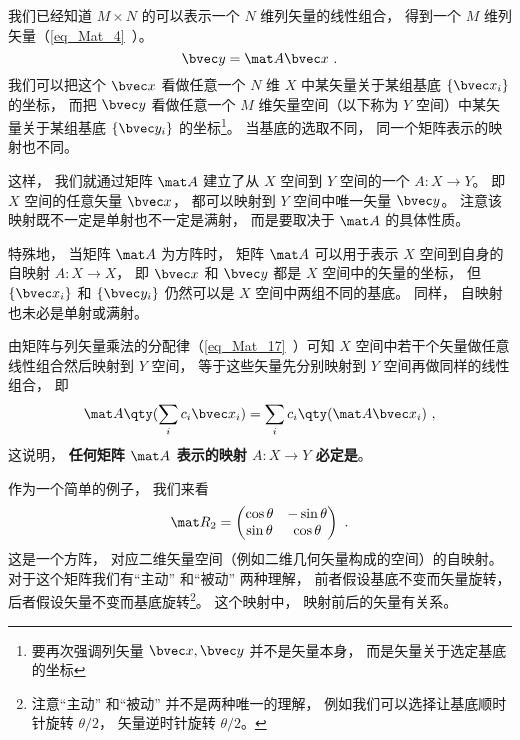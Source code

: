 


我们已经知道 $M\times N$ 的可以表示一个 $N$ 维列矢量的线性组合， 得到一个 $M$ 维列矢量（\autoref{eq_Mat_4}~）。
\begin{equation}\label{eq_MatLS_1}
\bvec y = \mat A \bvec x~.
\end{equation}
我们可以把这个 $\bvec x$ 看做任意一个 $N$ 维 $X$ 中某矢量关于某组基底 $\{\bvec x_i\}$ 的坐标， 而把 $\bvec y$ 看做任意一个 $M$ 维矢量空间（以下称为 $Y$ 空间）中某矢量关于某组基底 $\{\bvec y_i\}$ 的坐标\footnote{要再次强调列矢量 $\bvec x, \bvec y$ 并不是矢量本身， 而是矢量关于选定基底的坐标}。 当基底的选取不同， 同一个矩阵表示的映射也不同。

这样， 我们就通过矩阵 $\mat A$ 建立了从 $X$ 空间到 $Y$ 空间的一个 $A:X\to Y$。 即 $X$ 空间的任意矢量 $\bvec x$， 都可以映射到 $Y$ 空间中唯一矢量 $\bvec y$。 注意该映射既不一定是单射也不一定是满射， 而是要取决于 $\mat A$ 的具体性质。

特殊地， 当矩阵 $\mat A$ 为方阵时， 矩阵 $\mat A$ 可以用于表示 $X$ 空间到自身的自映射 $A:X\to X$， 即 $\bvec x$ 和 $\bvec y$ 都是 $X$ 空间中的矢量的坐标， 但 $\{\bvec x_i\}$ 和 $\{\bvec y_i\}$ 仍然可以是 $X$ 空间中两组不同的基底。 同样， 自映射也未必是单射或满射。

由矩阵与列矢量乘法的分配律（\autoref{eq_Mat_17}~）可知 $X$ 空间中若干个矢量做任意线性组合然后映射到 $Y$ 空间， 等于这些矢量先分别映射到 $Y$ 空间再做同样的线性组合， 即
\begin{equation}
\mat A \qty(\sum_i c_i \bvec x_i) = \sum_i c_i \qty(\mat A \bvec x_i)~,
\end{equation}
这说明， \textbf{任何矩阵 $\mat A$ 表示的映射 $A:X\to Y$ 必定是}。

作为一个简单的例子， 我们来看
\begin{equation}
\mat R_2 = \begin{pmatrix}
\cos\theta & - \sin\theta\\
\sin\theta &\cos\theta   
\end{pmatrix}~.
\end{equation}
这是一个方阵， 对应二维矢量空间（例如二维几何矢量构成的空间）的自映射。 对于这个矩阵我们有“主动” 和“被动” 两种理解， 前者假设基底不变而矢量旋转， 后者假设矢量不变而基底旋转\footnote{注意“主动” 和“被动” 并不是两种唯一的理解， 例如我们可以选择让基底顺时针旋转 $\theta/2$， 矢量逆时针旋转 $\theta/2$。}。 这个映射中， 映射前后的矢量有关系。

